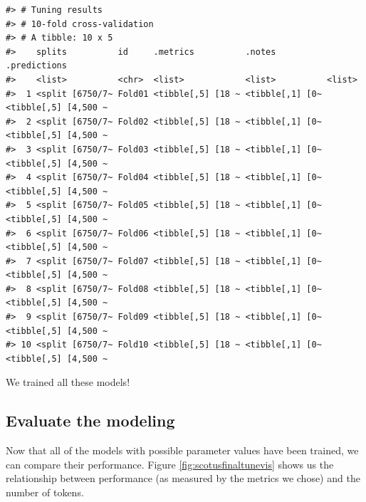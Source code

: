 \documentclass[
]{krantz}
\begin{document}
\begin{verbatim}
#> # Tuning results
#> # 10-fold cross-validation 
#> # A tibble: 10 x 5
#>    splits          id     .metrics          .notes          .predictions        
#>    <list>          <chr>  <list>            <list>          <list>              
#>  1 <split [6750/7~ Fold01 <tibble[,5] [18 ~ <tibble[,1] [0~ <tibble[,5] [4,500 ~
#>  2 <split [6750/7~ Fold02 <tibble[,5] [18 ~ <tibble[,1] [0~ <tibble[,5] [4,500 ~
#>  3 <split [6750/7~ Fold03 <tibble[,5] [18 ~ <tibble[,1] [0~ <tibble[,5] [4,500 ~
#>  4 <split [6750/7~ Fold04 <tibble[,5] [18 ~ <tibble[,1] [0~ <tibble[,5] [4,500 ~
#>  5 <split [6750/7~ Fold05 <tibble[,5] [18 ~ <tibble[,1] [0~ <tibble[,5] [4,500 ~
#>  6 <split [6750/7~ Fold06 <tibble[,5] [18 ~ <tibble[,1] [0~ <tibble[,5] [4,500 ~
#>  7 <split [6750/7~ Fold07 <tibble[,5] [18 ~ <tibble[,1] [0~ <tibble[,5] [4,500 ~
#>  8 <split [6750/7~ Fold08 <tibble[,5] [18 ~ <tibble[,1] [0~ <tibble[,5] [4,500 ~
#>  9 <split [6750/7~ Fold09 <tibble[,5] [18 ~ <tibble[,1] [0~ <tibble[,5] [4,500 ~
#> 10 <split [6750/7~ Fold10 <tibble[,5] [18 ~ <tibble[,1] [0~ <tibble[,5] [4,500 ~
\end{verbatim}

We trained all these models!

\hypertarget{regression-final-evaluation}{%
\subsection{Evaluate the modeling}\label{regression-final-evaluation}}

Now that all of the models with possible parameter values have been trained, we can compare their performance. Figure \ref{fig:scotusfinaltunevis} shows us the relationship between performance (as measured by the metrics we chose) and the number of tokens.
\end{document}
